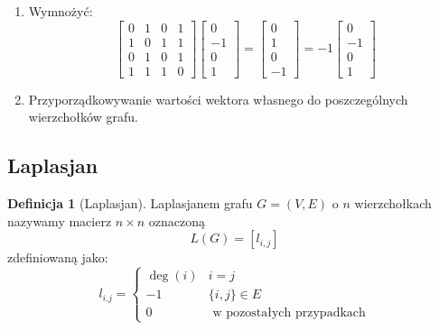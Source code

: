 \documentclass[a4paper,12pt]{article}
\theoremstyle{definition}%
\theoremstyle{definition}
\newtheorem{definition}{Definicja}%
\theoremstyle{problem}
\begin{document}
\begin{enumerate}[label=\Roman*.]
\item Wymnożyć:
$$\begin{bmatrix}
0&1&0&1\\
1&0&1&1\\
0&1&0&1\\
1&1&1&0
\end{bmatrix}\begin{bmatrix}
0\\-1\\0\\1
\end{bmatrix}=\begin{bmatrix}
0\\1\\0\\-1
\end{bmatrix}=-1\begin{bmatrix}
0\\-1\\0\\1
\end{bmatrix}$$

\item Przyporządkowywanie wartości wektora własnego do poszczególnych wierzchołków grafu. 
\end{enumerate}

\subsection{Laplasjan}
\begin{definition}[Laplasjan]
Laplasjanem grafu $G=(V,E)$ o $n$ wierzchołkach nazywamy macierz $n\times n$ oznaczoną $$L(G)=[l_{i,j}]$$ zdefiniowaną jako: $$l_{i.j}=\left\{\begin{matrix}
\deg (i) & i=j\\
-1 & \{i,j\}\in E\\
0 & \text{ w pozostałych przypadkach}
\end{matrix}\right.$$
\end{definition}
\end{document}
